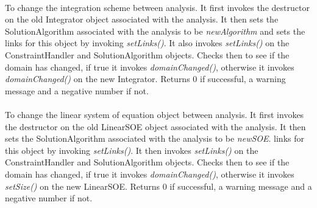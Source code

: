 \\
To change the integration scheme between analysis. It first invokes the
destructor on the old Integrator object associated with the
analysis. It then sets the SolutionAlgorithm 
associated with the analysis to be {\em newAlgorithm} and sets the
links for this object by invoking {\em setLinks()}. It also invokes
{\em setLinks()} on the ConstraintHandler and SolutionAlgorithm
objects. Checks then to see if the domain has changed, if true it
invokes {\em domainChanged()}, otherwise it invokes {\em
domainChanged()} on the new Integrator. Returns $0$ if
successful, a warning message and a negative number if not.\\

\\
To change the linear system of equation object between analysis. It
first invokes the destructor on the old LinearSOE object associated
with the analysis. It then sets the SolutionAlgorithm 
associated with the analysis to be {\em newSOE}.
links for this object by invoking {\em setLinks()}. It then invokes
{\em setLinks()} on the ConstraintHandler and SolutionAlgorithm
objects. Checks then to see if the domain has changed, if true it
invokes {\em domainChanged()}, otherwise it invokes {\em
setSize()} on the new LinearSOE. Returns $0$ if successful, a warning
message and a negative number if not.\\ 
